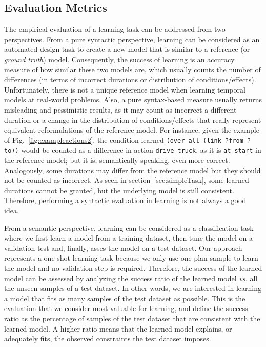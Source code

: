 \documentclass[runningheads]{llncs}
\begin{document}
\subsection{Evaluation Metrics}


The empirical evaluation of a learning task can be addressed from two perspectives. From a pure syntactic perspective, learning can be considered as an automated design task to create a new model that is similar to a reference (or {\em ground truth}) model. Consequently, the success of learning is an accuracy measure of how similar these two models are, which usually counts the number of differences (in terms of incorrect durations or distribution of conditions/effects).
Unfortunately, there is not a unique reference model when learning temporal models at real-world problems.
Also, a pure syntax-based measure usually returns misleading and pessimistic results, as it may count as incorrect a different duration or a change in the distribution of conditions/effects that really represent equivalent reformulations of the reference model. For instance, given the example of Fig.~\ref{fig:exampleactions2}, the condition learned \texttt{(over all (link ?from ?to))} would be counted as a difference in action \texttt{drive-truck}, as it is \texttt{at start} in the reference model; but it is, semantically speaking, even more correct. Analogously, some durations may differ from the reference model but they should not be counted as incorrect. As seen in section~\ref{sec:simpleTask}, some learned durations cannot be granted, but the underlying model is still consistent. Therefore, performing a syntactic evaluation in learning is not always a good idea.


From a semantic perspective, learning can be considered as a classification task where we first learn a model from a training dataset, then tune the model on a validation test and, finally, asses the model on a test dataset. Our approach represents a one-shot learning task because we only use one plan sample to learn the model and no validation step is required.
Therefore, the success of the learned model can be assessed by analyzing the success ratio of the learned model \emph{vs.} all the unseen samples of a test dataset. In other words, we are interested in learning a model that fits as many samples of the test dataset as possible. This is the evaluation that we consider most valuable for learning, and define the success ratio as the percentage of samples of the test dataset that are consistent with the learned model. A higher ratio means that the learned model explains, or adequately fits, the observed constraints the test dataset imposes.
\end{document}
